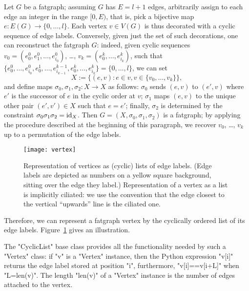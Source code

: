 Let $G$ be a fatgraph; assuming $G$ has $E = l+1$ edges, arbitrarily
assign to each edge an integer in the range $[0, E)$, that is, pick a
bijective map $e: E(G) \to \{0, \dots, l\}$.  Each vertex $v \in V(G)$
is thus decorated with a cyclic sequence of edge labels.  Conversely,
given just the set of such decorations, one can reconstruct the
fatgraph $G$: indeed, given cyclic sequences $v_0 = (e_0^0,
e^0_1, \ldots, e^0_{i_0})$, \ldots, $v_k = (e^k_0, \ldots,
e^k_{i_k})$, such that $\{e^0_0, \ldots, e^0_{i_0}, e^1_0, \ldots,
e^{k-1}_{i_{k-1}}, e^k_0, \ldots, e^k_{i_k}\} = \{0, \ldots, l\}$,
we can set
\begin{equation*}
  X := \{ (e, v) : e \in v, v\in \{v_0, \ldots, v_k\} \},
\end{equation*}
and define maps $\sigma_0, \sigma_1, \sigma_2: X \to X$ as follows:
$\sigma_0$ sends $(e, v)$ to $(e', v)$ where $e'$ is the successor of
$e$ in the cyclic order at $v$; $\sigma_1$ maps $(e, v)$ to the unique
other pair $(e', v') \in X$ such that $e = e'$; finally, $\sigma_2$ is
determined by the constraint $\sigma_0\sigma_1\sigma_2 = \operatorname{id}_X$.  Then
$G = (X, \sigma_0, \sigma_1, \sigma_2)$ is a fatgraph; by applying the
procedure described at the beginning of this paragraph, we recover
$v_0$, \ldots, $v_k$ up to a permutation of the edge labels.
\begin{figure}
  \centering
  \texttt{[image: vertex]}
  \caption{Representation of vertices as (cyclic) lists of edge
    labels.  (Edge labels are depicted as numbers on a yellow square
    background, sitting over the edge they label.)  Representation of
    a vertex as a list is implicitly ciliated: we use the convention
    that the edge closest to the vertical ``upwards'' line is the
    ciliated one.}
  \label{fig:vertex}
\end{figure}

Therefore, we can represent a fatgraph vertex by the cyclically
ordered list of its edge labels.  Figure~\ref{fig:vertex} gives an
illustration. 

The "CyclicList" base class provides all the functionality needed by
such a "Vertex" class: if "v" is a "Vertex" instance, then the
Python expression "v[i]" returns the edge label stored at
position "i", furthermore, "v[i]==v[i+L]" when "L=len(v)".
The length "len(v)" of a "Vertex" instance is the number of edges attached
to the vertex.  


